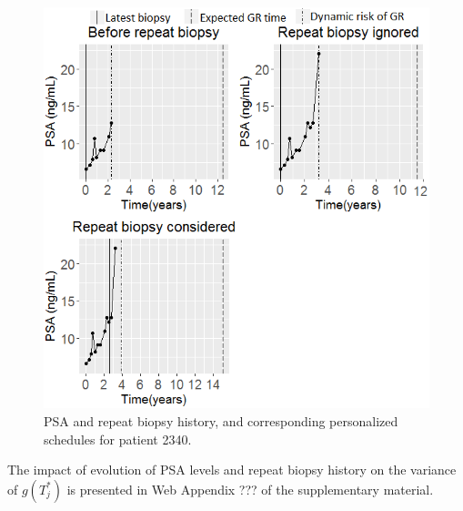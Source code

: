 \begin{figure}
\centerline{\includegraphics[width=\columnwidth]{images/prias_demo/case_2340.png}}
\caption{PSA and repeat biopsy history, and corresponding personalized schedules for patient 2340.}
\label{fig : prias_demo_pid_2340}
\end{figure}

The impact of evolution of PSA levels and repeat biopsy history on the variance of $g(T^*_j)$ is presented in Web Appendix ??? of the supplementary material.